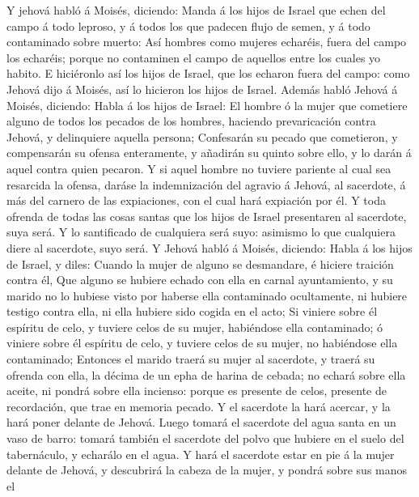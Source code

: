  Y jehová habló á Moisés, diciendo:  Manda á los
hijos de Israel que echen del campo á todo leproso, y á todos los que
padecen flujo de semen, y á todo contaminado sobre muerto: 
Así hombres como mujeres echaréis, fuera del campo los echaréis; porque
no contaminen el campo de aquellos entre los cuales yo habito.
 E hiciéronlo así los hijos de Israel, que los echaron fuera
del campo: como Jehová dijo á Moisés, así lo hicieron los hijos de
Israel.  Además habló Jehová á Moisés, diciendo:
 Habla á los hijos de Israel: El hombre ó la mujer que
cometiere alguno de todos los pecados de los hombres, haciendo
prevaricación contra Jehová, y delinquiere aquella persona; 
Confesarán su pecado que cometieron, y compensarán su ofensa
enteramente, y añadirán su quinto sobre ello, y lo darán á aquel contra
quien pecaron.  Y si aquel hombre no tuviere pariente al
cual sea resarcida la ofensa, daráse la indemnización del agravio á
Jehová, al sacerdote, á más del carnero de las expiaciones, con el cual
hará expiación por él.  Y toda ofrenda de todas las cosas
santas que los hijos de Israel presentaren al sacerdote, suya será.
 Y lo santificado de cualquiera será suyo: asimismo lo que
cualquiera diere al sacerdote, suyo será.  Y Jehová habló á
Moisés, diciendo:  Habla á los hijos de Israel, y diles:
Cuando la mujer de alguno se desmandare, é hiciere traición contra él,
 Que alguno se hubiere echado con ella en carnal
ayuntamiento, y su marido no lo hubiese visto por haberse ella
contaminado ocultamente, ni hubiere testigo contra ella, ni ella hubiere
sido cogida en el acto;  Si viniere sobre él espíritu de
celo, y tuviere celos de su mujer, habiéndose ella contaminado; ó
viniere sobre él espíritu de celo, y tuviere celos de su mujer, no
habiéndose ella contaminado;  Entonces el marido traerá su
mujer al sacerdote, y traerá su ofrenda con ella, la décima de un epha
de harina de cebada; no echará sobre ella aceite, ni pondrá sobre ella
incienso: porque es presente de celos, presente de recordación, que trae
en memoria pecado.  Y el sacerdote la hará acercar, y la
hará poner delante de Jehová.  Luego tomará el sacerdote
del agua santa en un vaso de barro: tomará también el sacerdote del
polvo que hubiere en el suelo del tabernáculo, y echarálo en el agua.
 Y hará el sacerdote estar en pie á la mujer delante de
Jehová, y descubrirá la cabeza de la mujer, y pondrá sobre sus manos el
